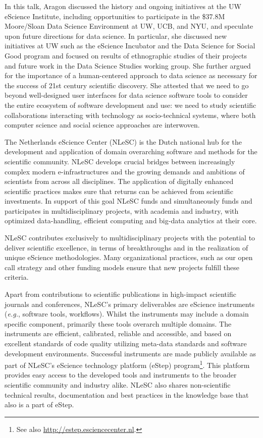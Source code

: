 \documentclass[a4paper,UKenglish]{dagrep}
\newcommand{\eg}{\emph{e.g.},\xspace}
\begin{document}
In this talk, Aragon discussed the history and ongoing initiatives at the UW eScience Institute, including opportunities to participate in the \$37.8M Moore/Sloan Data Science Environment at UW, UCB, and NYU, and speculate upon future directions for data science. In particular, she discussed new initiatives at UW such as the eScience Incubator and the Data Science for Social Good program and focused on results of ethnographic studies of their projects and future work in the Data Science Studies working group. She further argued for the importance of a human-centered approach to data science as necessary for the success of 21st century scientific discovery. She attested that we need to go beyond well-designed user interfaces for data science software tools to consider the entire ecosystem of software development and use: we need to study scientific collaborations interacting with technology as socio-technical systems, where both computer science and social science approaches are interwoven.


The Netherlands eScience Center (NLeSC) is the Dutch national hub for
the development and application of domain overarching software and
methods for the scientific community. NLeSC develops crucial bridges
between increasingly complex modern e-infrastructures and the growing
demands and ambitions of scientists from across all disciplines. The
application of digitally enhanced scientific practices makes sure that
returns can be achieved from scientific investments. In support of this
goal NLeSC funds and simultaneously funds and participates in
multidisciplinary projects, with academia and industry, with optimized
data-handling, efficient computing and big-data analytics at their
core.

NLeSC contributes exclusively to multidisciplinary projects with the
potential to deliver scientific excellence, in terms of breakthroughs
and in the realization of unique eScience methodologies. Many
organizational practices, such as our open call strategy and other
funding models ensure that new projects fulfill these criteria.

Apart from contributions to scientific publications in high-impact
scientific journals and conferences, NLeSC's primary deliverables are
eScience instruments (\eg software tools, workflows). Whilst the
instruments may include a domain specific component, primarily these
tools overarch multiple domains. The instruments are efficient,
calibrated, reliable and accessible, and based on excellent standards
of code quality utilizing meta-data standards and software development
environments. Successful instruments are made publicly available as
part of NLeSC's eScience technology platform (eStep)
program\footnote{See also \url{http://estep.esciencecenter.nl}.}.
This platform provides easy access to the developed tools and instruments
to the broader scientific community and industry alike. NLeSC also
shares non-scientific technical results, documentation and best
practices in the knowledge base that also is a part of eStep.
\end{document}

